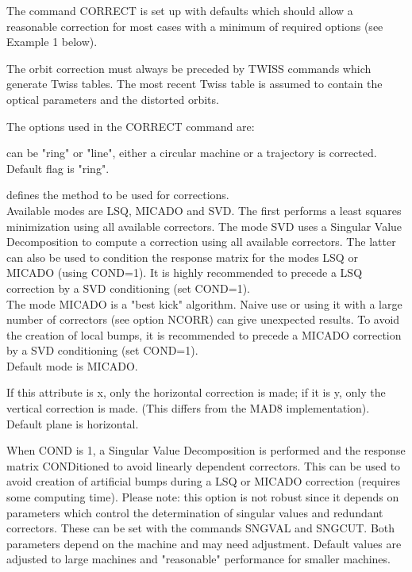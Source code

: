 The command CORRECT is set up with defaults which should allow a
reasonable correction for most cases with a minimum of required options
(see Example 1 below).  

The orbit correction must always be preceded by TWISS commands  which
generate Twiss tables. The most recent Twiss table is assumed to contain
the optical parameters and the distorted orbits. 

The options used in the CORRECT command are: 

\begin{madlist}
    can be "ring" or "line", either a circular machine
     or a trajectory is corrected.   
     \\ Default flag is "ring". 

    defines the method to be used for corrections. 
     \\ Available modes are LSQ, MICADO and SVD.  The first performs a
     least squares minimization using all available correctors. The mode
     SVD uses a Singular Value Decomposition to compute a correction
     using all available correctors. The latter can also be used to
     condition the response matrix for the modes LSQ or MICADO (using
     COND=1). It is highly recommended to precede a LSQ correction by a
     SVD conditioning (set COND=1).  
     \\ The mode MICADO is a "best kick" algorithm. Naive use or using
     it with a large number of correctors (see option NCORR) can give
     unexpected results. To avoid the creation of local bumps, it is
     recommended to precede a MICADO correction by a SVD conditioning
     (set COND=1).  
     \\ Default mode is MICADO.            

    If this attribute is x, only the horizontal correction
     is made; if it is y, only the vertical correction is made. (This
     differs from the MAD8 implementation).  
     \\ Default plane is horizontal. 

    When COND is 1, a Singular Value Decomposition is
     performed and  the response matrix CONDitioned to avoid linearly
     dependent correctors. This can be used to avoid creation of
     artificial bumps during a LSQ or MICADO correction (requires some
     computing time).  Please note: this option is not robust since it
     depends on parameters which control the determination of singular
     values and redundant correctors. These can be set with the commands
     SNGVAL and SNGCUT. Both parameters depend on the machine and may
     need adjustment. Default values are adjusted to large machines and
     "reasonable" performance for smaller machines.  
     \\


\end{madlist}
